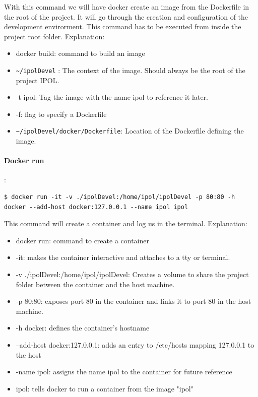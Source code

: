 \documentclass[a4paper,12pt]{article}
\begin{document}
With this command we will have docker create an image from the Dockerfile in the root of the project. It will go through the creation and configuration of the development envirorment. This command has to be executed from inside the project root folder. Explanation:
\begin{itemize}
  \item docker build: command to build an image
  \item {\tt \~{}/ipolDevel} : The context of the image. Should always be the root of the project IPOL.
  \item -t ipol: Tag the image with the name ipol to reference it later.
  \item -f: flag to specify a Dockerfile
  \item {\tt \~{}/ipolDevel/docker/Dockerfile}: Location of the Dockerfile defining the image.
\end{itemize}

\paragraph{Docker run}:\\
\begin{lstlisting}[firstnumber=1,breaklines]
  $ docker run -it -v ./ipolDevel:/home/ipol/ipolDevel -p 80:80 -h docker --add-host docker:127.0.0.1 --name ipol ipol
\end{lstlisting}

This command will create a container and log us in the terminal. Explanation:
\begin{itemize}
  \item docker run: command to create a container
  \item -it: makes the container interactive and attaches to a tty or terminal.
  \item -v ./ipolDevel:/home/ipol/ipolDevel: Creates a volume to share the project folder between the container and the host machine.
  \item -p 80:80: exposes port 80 in the container and links it to port 80 in the host machine.
  \item -h docker: defines the container's hostname
  \item --add-host docker:127.0.0.1: adds an entry to /etc/hosts mapping 127.0.0.1 to the host
  \item -name ipol: assigns the name ipol to the container for future reference
  \item ipol: tells docker to run a container from the image "ipol"
\end{itemize}
\end{document}
